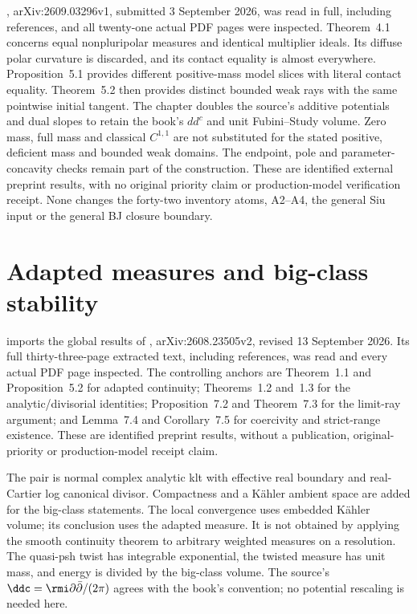 \cite{Xiao26NonuniquenessV1}, arXiv:2609.03296v1,
submitted 3 September 2026, was read in full, including
references, and all twenty-one actual PDF pages were inspected.
Theorem~4.1 concerns equal nonpluripolar measures and identical
multiplier ideals. Its diffuse polar curvature is discarded,
and its contact equality is almost everywhere. Proposition~5.1
provides different positive-mass model slices with literal
contact equality. Theorem~5.2 then provides distinct bounded
weak rays with the same pointwise initial tangent.
The chapter doubles the source's additive potentials and dual
slopes to retain the book's $dd^c$ and unit Fubini--Study volume.
Zero mass, full mass and classical $C^{1,1}$ are not substituted
for the stated positive, deficient mass and bounded weak domains.
The endpoint, pole and parameter-concavity checks remain part
of the construction. These are identified external preprint
results, with no original priority claim or production-model
verification receipt. None changes the forty-two inventory atoms,
A2--A4, the general Siu input or the general BJ closure boundary.

\section{Adapted measures and big-class stability}
\label{sec:provenance-klt-global}

 imports the global results of
\cite{DarvasZhang26KltV2}, arXiv:2608.23505v2, revised
13 September 2026. Its full thirty-three-page extracted text,
including references, was read and every actual PDF page inspected.
The controlling anchors are Theorem~1.1 and Proposition~5.2 for
adapted continuity; Theorems~1.2 and~1.3 for the analytic/divisorial
identities; Proposition~7.2 and Theorem~7.3 for the limit-ray
argument; and Lemma~7.4 and Corollary~7.5 for coercivity and
strict-range existence. These are identified preprint results,
without a publication, original-priority or production-model receipt
claim.

The pair is normal complex analytic klt with effective real
boundary and real-Cartier log canonical divisor. Compactness and a
K\"ahler ambient space are added for the big-class statements.
The local convergence uses embedded K\"ahler volume; its conclusion
uses the adapted measure. It is not obtained by applying the smooth
continuity theorem to arbitrary weighted measures on a resolution.
The quasi-psh twist has integrable exponential, the twisted measure
has unit mass, and energy is divided by the big-class volume.
The source's $\ddc=\rmi\partial\bar\partial/(2\pi)$ agrees
with the book's convention; no potential rescaling is needed here.

